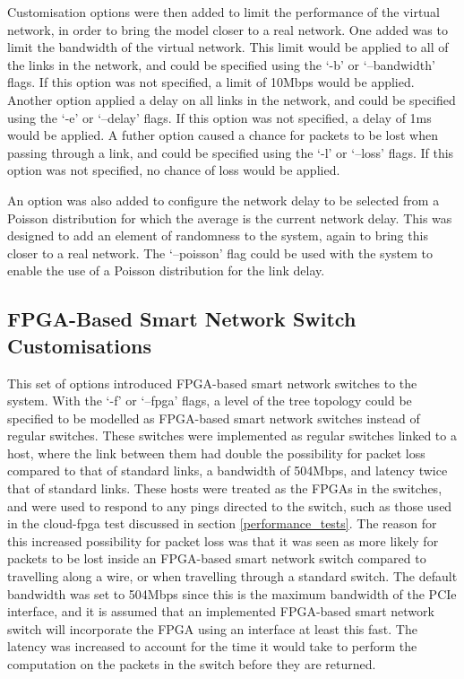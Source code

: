 {%
Customisation options were then added to limit the performance of the virtual network, in order to bring the model closer to a real network.
One added was to limit the bandwidth of the virtual network.
This limit would be applied to all of the links in the network, and could be specified using the `-b' or `--bandwidth' flags.
If this option was not specified, a limit of 10Mbps would be applied.
Another option applied a delay on all links in the network, and could be specified using the `-e' or `--delay' flags.
If this option was not specified, a delay of 1ms would be applied.
A futher option caused a chance for packets to be lost when passing through a link, and could be specified using the `-l' or `--loss' flags.
If this option was not specified, no chance of loss would be applied.

An option was also added to configure the network delay to be selected from a Poisson distribution for which the average is the current network delay.
This was designed to add an element of randomness to the system, again to bring this closer to a real network.
The `--poisson' flag could be used with the system to enable the use of a Poisson distribution for the link delay.

\subsection{FPGA-Based Smart Network Switch Customisations}
\label{FPGA_Based_Smart_Network_Switch_Customisations}

This set of options introduced FPGA-based smart network switches to the system.
With the `-f' or `--fpga' flags, a level of the tree topology could be specified to be modelled as FPGA-based smart network switches instead of regular switches.
These switches were implemented as regular switches linked to a host, where the link between them had double the possibility for packet loss compared to that of standard links, a bandwidth of 504Mbps, and latency twice that of standard links.
These hosts were treated as the FPGAs in the switches, and were used to respond to any pings directed to the switch, such as those used in the cloud-fpga test discussed in section \ref{performance_tests}.
The reason for this increased possibility for packet loss was that it was seen as more likely for packets to be lost inside an FPGA-based smart network switch compared to travelling along a wire, or when travelling through a standard switch.
The default bandwidth was set to 504Mbps since this is the maximum bandwidth of the PCIe interface, and it is assumed that an implemented FPGA-based smart network switch will incorporate the FPGA using an interface at least this fast.
The latency was increased to account for the time it would take to perform the computation on the packets in the switch before they are returned.

}
